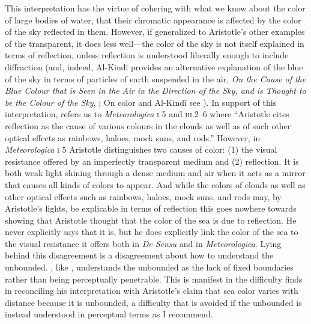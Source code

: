 This interpretation has the virtue of cohering with what we know about the color of large bodies of water, that their chromatic appearance is affected by the color of the sky reflected in them. However, if generalized to Aristotle's other examples of the transparent, it does less well---the color of the sky is not itself explained in terms of reflection, unless reflection is understood liberally enough to include diffraction (and, indeed, Al-Kind\={i} provides an alternative explanation of the blue of the sky in terms of particles of earth suspended in the air, \emph{On the Cause of the Blue Colour that is Seen in the Air in the Direction of the Sky, and is Thought to be the Colour of the Sky}, \citealt[139--143]{Adamson:2012fk}; On color and Al-Kind\=i see \citealt{Adamson:2006ys}). In support of this interpretation, \citet[130]{Sorabji:2004fk} refers us to \emph{Meteorologica} \textsc{i} 5 and \textsc{iii}.2--6 where ``Aristotle cites reflection as the cause of various colours in the clouds as well as of such other optical effects as rainbows, haloes, mock suns, and rods.'' However, in \emph{Meteorologica} \textsc{i} 5 Aristotle distinguishes two causes of color: (1) the visual resistance offered by an imperfectly transparent medium and (2) reflection. It is both weak light shining through a dense medium and air when it acts as a mirror that causes all kinds of colors to appear. And while the colors of clouds as well as other optical effects such as rainbows, haloes, mock suns, and rods may, by Aristotle's lights, be explicable in terms of reflection this goes nowhere towards showing that Aristotle thought that the color of the sea is due to reflection. He never explicitly says that it is, but he does explicitly link the color of the sea to the visual resistance it offers both in \emph{De Sensu} and in \emph{Meteorologica}. Lying behind this disagreement is a disagreement about how to understand the unbounded. \citet{Sorabji:2004fk}, like \citet{Broackes:1999uq}, understands the unbounded as the lack of fixed boundaries rather than being perceptually penetrable. This is manifest in the difficulty \citet[131]{Sorabji:2004fk} finds in reconciling his interpretation with Aristotle's claim that sea color varies with distance because it is unbounded, a difficulty that is avoided if the unbounded is instead understood in perceptual terms as I recommend.

